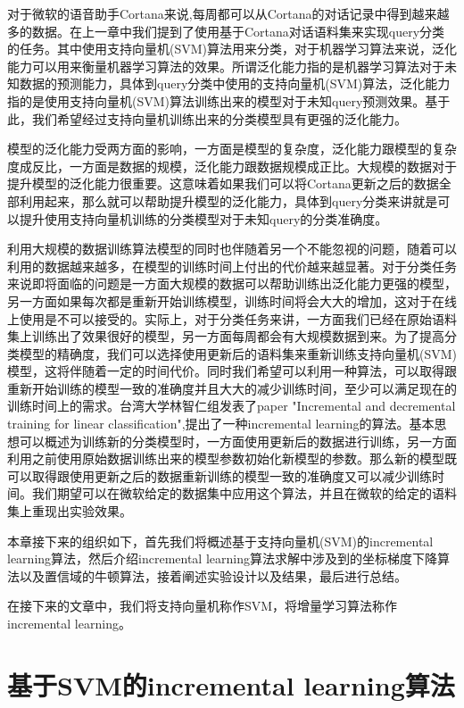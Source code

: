 \documentclass[master]{njuthesis}
\begin{document}
\begin{enumerate}
\begin{enumerate}
\begin{enumerate}
   对于微软的语音助手Cortana来说,每周都可以从Cortana的对话记录中得到越来越多的数据。在上一章中我们提到了使用基于Cortana对话语料集来实现query分类的任务。其中使用支持向量机(SVM)算法用来分类，对于机器学习算法来说，泛化能力可以用来衡量机器学习算法的效果。所谓泛化能力指的是机器学习算法对于未知数据的预测能力，具体到query分类中使用的支持向量机(SVM)算法，泛化能力指的是使用支持向量机(SVM)算法训练出来的模型对于未知query预测效果。基于此，我们希望经过支持向量机训练出来的分类模型具有更强的泛化能力。
   
   模型的泛化能力受两方面的影响，一方面是模型的复杂度，泛化能力跟模型的复杂度成反比，一方面是数据的规模，泛化能力跟数据规模成正比。大规模的数据对于提升模型的泛化能力很重要。这意味着如果我们可以将Cortana更新之后的数据全部利用起来，那么就可以帮助提升模型的泛化能力，具体到query分类来讲就是可以提升使用支持向量机训练的分类模型对于未知query的分类准确度。
   
   利用大规模的数据训练算法模型的同时也伴随着另一个不能忽视的问题，随着可以利用的数据越来越多，在模型的训练时间上付出的代价越来越显著。对于分类任务来说即将面临的问题是一方面大规模的数据可以帮助训练出泛化能力更强的模型，另一方面如果每次都是重新开始训练模型，训练时间将会大大的增加，这对于在线上使用是不可以接受的。实际上，对于分类任务来讲，一方面我们已经在原始语料集上训练出了效果很好的模型，另一方面每周都会有大规模数据到来。为了提高分类模型的精确度，我们可以选择使用更新后的语料集来重新训练支持向量机(SVM)模型，这将伴随着一定的时间代价。同时我们希望可以利用一种算法，可以取得跟重新开始训练的模型一致的准确度并且大大的减少训练时间，至少可以满足现在的训练时间上的需求。台湾大学林智仁组发表了paper "Incremental and decremental training for linear classification",提出了一种incremental learning的算法。基本思想可以概述为训练新的分类模型时，一方面使用更新后的数据进行训练，另一方面利用之前使用原始数据训练出来的模型参数初始化新模型的参数。那么新的模型既可以取得跟使用更新之后的数据重新训练的模型一致的准确度又可以减少训练时间。我们期望可以在微软给定的数据集中应用这个算法，并且在微软的给定的语料集上重现出实验效果。

   本章接下来的组织如下，首先我们将概述基于支持向量机(SVM)的incremental learning算法，然后介绍incremental learning算法求解中涉及到的坐标梯度下降算法以及置信域的牛顿算法，接着阐述实验设计以及结果，最后进行总结。

   在接下来的文章中，我们将支持向量机称作SVM，将增量学习算法称作incremental learning。

\section{基于SVM的incremental learning算法}


\end{enumerate}
\end{enumerate}
\end{enumerate}
\end{document}
